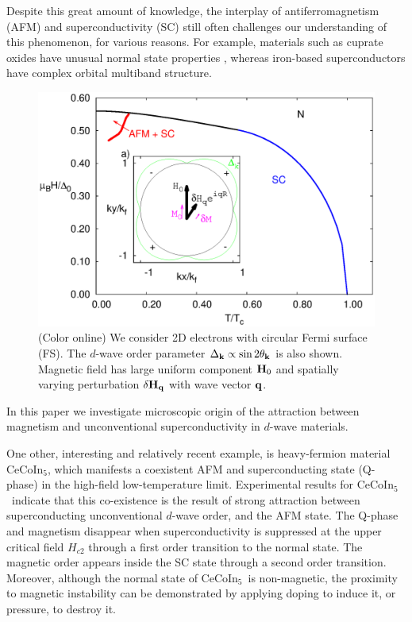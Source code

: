 \documentclass[aps,prl,twocolumn,showpacs,amsmath,amssymb]{revtex4-1}
\newcommand{\cecoin}{CeCoIn$_5$}
\begin{document}
Despite this great amount of knowledge, the 
interplay of antiferromagnetism (AFM) and superconductivity (SC) still often challenges
our understanding of this phenomenon, for various reasons. 
For example, materials such as cuprate oxides have unusual normal state properties \cite{x}, 
whereas iron-based superconductors have complex orbital multiband structure\cite{x}. 

\begin{figure}[t]
\includegraphics[width = 0.5\linewidth]{Fig1.eps}
\caption{ \label{fig:model}
(Color online) 
We consider 2D electrons with circular Fermi surface (FS). 
The $d$-wave order parameter $\Delta_{\bf k} \propto \sin 2\theta_{\bf k} $ is also shown. 
Magnetic field has large uniform component ${\bf H}_0$ and spatially varying perturbation $\delta {\bf H}_{\bf q}$
with wave vector ${\bf q}$. 
}
\end{figure}

In this paper we investigate microscopic origin of the 
attraction between magnetism and unconventional superconductivity 
in $d$-wave materials. 

One other, interesting and relatively recent example, is heavy-fermion material 
\cecoin, which manifests a coexistent AFM and superconducting state (Q-phase) \cite{cecoin5_Bianchi, cecoin5_Kenzelmann, cecoin5_Kenzelmann2}
in the high-field low-temperature limit. 
Experimental results for \cecoin\ indicate that this co-existence is the result of 
strong attraction between superconducting unconventional $d$-wave order, 
and the AFM state\cite{cecoin5_Bianchi,cecoin5_Kenzelmann,cecoin5_Kenzelmann2}. 
The Q-phase and magnetism disappear when superconductivity is suppressed at the upper critical field $H_{c2}$ 
through a first order transition to the normal state. 
The magnetic order appears inside the SC state through a second order transition. 
Moreover, although the normal state of \cecoin\ is non-magnetic, the proximity to magnetic 
instability can be demonstrated by applying doping to induce it, or pressure, to destroy it.\cite{doped_cecoin5, cecoin5_Kenzelmann, cecoin5_Kenzelmann2, cecoin5_magnetism_chapter} 
\end{document}
